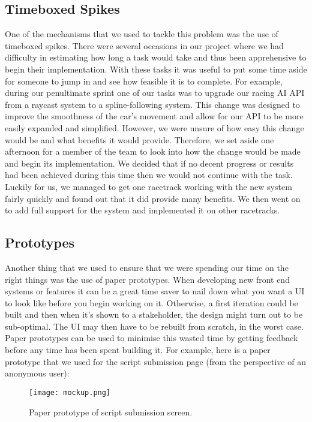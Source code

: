 \subsection{Timeboxed Spikes}
One of the mechanisms that we used to tackle this problem was the use of timeboxed spikes. There were several occasions in our project where we had difficulty in estimating how long a task would take and thus been apprehensive to begin their implementation. With these tasks it was useful to put some time aside for someone to jump in and see how feasible it is to complete. For example, during our penultimate sprint one of our tasks was to upgrade our racing AI API from a raycast system to a spline-following system. This change was designed to improve the smoothness of the car's movement and allow for our API to be more easily expanded and simplified. However, we were unsure of how easy this change would be and what benefits it would provide. Therefore, we set aside one afternoon for a member of the team to look into how the change would be made and begin its implementation. We decided that if no decent progress or results had been achieved during this time then we would not continue with the task. Luckily for us, we managed to get one racetrack working with the new system fairly quickly and found out that it did provide many benefits. We then went on to add full support for the system and implemented it on other racetracks.

\subsection{Prototypes}
Another thing that we used to ensure that we were spending our time on the right things was the use of paper prototypes. When developing new front end systems or features it can be a great time saver to nail down what you want a UI to look like before you begin working on it. Otherwise, a first iteration could be built and then when it's shown to a stakeholder, the design might turn out to be sub-optimal. The UI may then have to be rebuilt from scratch, in the worst case. Paper prototypes can be used to minimise this wasted time by getting feedback before any time has been spent building it. For example, here is a paper prototype that we used for the script submission page (from the perspective of an anonymous user):

\begin{figure}[H]
\centering
\texttt{[image: mockup.png]}
\caption{Paper prototype of script submission screen.}
\end{figure}

